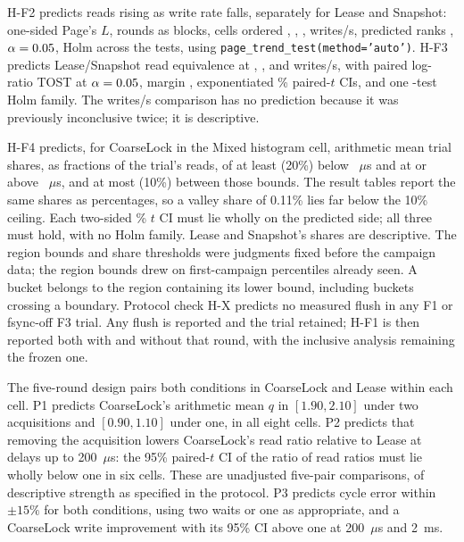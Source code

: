 H-F2 predicts reads rising as write rate falls, separately for Lease and Snapshot: one-sided Page's $L$, \FollowRounds{} rounds as blocks, cells ordered \FollowRateHigh{}, \FollowRateThird{}, \FollowRateSecond{}, \FollowRateLow{} writes/s, predicted ranks \FollowPageRanks{}, $\alpha=0.05$, Holm across the \FollowPageFamily{} tests, using \texttt{page\_trend\_test(method='auto')}. H-F3 predicts Lease/Snapshot read equivalence at \FollowRateLow{}, \FollowRateSecond{}, and \FollowRateThird{} writes/s, with paired log-ratio TOST at $\alpha=0.05$, margin \FollowMargin{}, exponentiated \FollowCI{}\% paired-$t$ CIs, and one \FollowRatioFamily{}-test Holm family. The \FollowRateHigh{} writes/s comparison has no prediction because it was previously inconclusive twice; it is descriptive.

H-F4 predicts, for CoarseLock in the Mixed histogram cell, arithmetic mean trial shares, as fractions of the trial's reads, of at least \FollowRegionMin{} (20\%) below \FollowFastBound{}~$\mu$s and at or above \FollowBlockedBound{}~$\mu$s, and at most \FollowValleyMax{} (10\%) between those bounds. The result tables report the same shares as percentages, so a valley share of 0.11\% lies far below the 10\% ceiling. Each two-sided \FollowRegionCI{}\% $t$ CI must lie wholly on the predicted side; all three must hold, with no Holm family. Lease and Snapshot's shares are descriptive. The region bounds and share thresholds were judgments fixed before the campaign data; the region bounds drew on first-campaign percentiles already seen. A bucket belongs to the region containing its lower bound, including buckets crossing a boundary. Protocol check H-X predicts no measured flush in any F1 or fsync-off F3 trial. Any flush is reported and the trial retained; H-F1 is then reported both with and without that round, with the inclusive analysis remaining the frozen one.

The five-round design pairs both conditions in CoarseLock and Lease within each cell. P1 predicts CoarseLock's arithmetic mean $q$ in $[1.90,2.10]$ under two acquisitions and $[0.90,1.10]$ under one, in all eight cells. P2 predicts that removing the acquisition lowers CoarseLock's read ratio relative to Lease at delays up to 200~$\mu$s: the 95\% paired-$t$ CI of the ratio of read ratios must lie wholly below one in six cells. These are unadjusted five-pair comparisons, of descriptive strength as specified in the protocol. P3 predicts cycle error within $\pm15\%$ for both conditions, using two waits or one as appropriate, and a CoarseLock write improvement with its 95\% CI above one at 200~$\mu$s and 2~ms.

